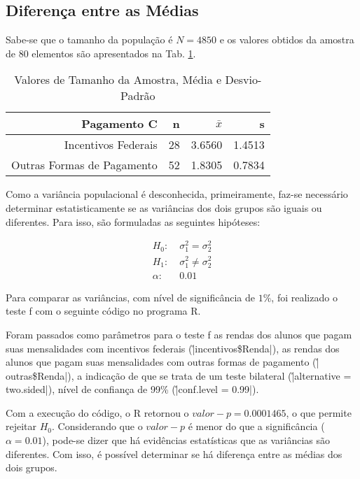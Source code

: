 \subsection{Diferença entre as Médias}

Sabe-se que o tamanho da população é $N = 4850$ e os valores obtidos da amostra de 80 elementos são apresentados na Tab. \ref{tb:5a}.

\begin{table}[ht]
\centering
\caption{Valores de Tamanho da Amostra, Média e Desvio-Padrão} 
\label{tb:5a}
\begin{tabular}{rrrr}
  \toprule
  Pagamento C & n & $\bar{x}$ & s \\
  \midrule
 Incentivos Federais & 28 & 3.6560 & 1.4513 \\ 
 Outras Formas de Pagamento & 52 & 1.8305 & 0.7834 \\
   \bottomrule
\end{tabular}
\end{table}

Como a variância populacional é desconhecida, primeiramente, faz-se necessário determinar estatisticamente se as variâncias dos dois grupos são iguais ou diferentes. Para isso, são formuladas as 
seguintes hipóteses:

\begin{align*} 
		H_0\!:   &\; \sigma^2_1 = \sigma^2_2 \\
		H_1\!:   &\; \sigma^2_1 \neq \sigma^2_2  \\
		\alpha\!:&\; 0.01
\end{align*}

Para comparar as variâncias, com nível de significância de $1\%$, foi realizado o teste f com o seguinte código no programa R.


Foram passados como parâmetros para o teste f as rendas dos alunos que pagam suas mensalidades com incentivos federais (\r|incentivos\$Renda|), as rendas dos alunos que pagam suas mensalidades com 
outras formas de pagamento (\r|outras\$Renda|), a indicação de que se trata de um teste bilateral (\r|alternative = two.sided|), nível de confiança de 99\% (\r|conf.level = 0.99|).

Com a execução do código, o R retornou o $valor-p = 0.0001465$, o que permite rejeitar $H_{0}$. Considerando que o $valor-p$ é menor do que a significância ($\alpha = 0.01$), pode-se dizer que há 
evidências estatísticas que as variâncias são diferentes. Com isso, é possível determinar se há diferença entre as médias dos dois grupos.  

